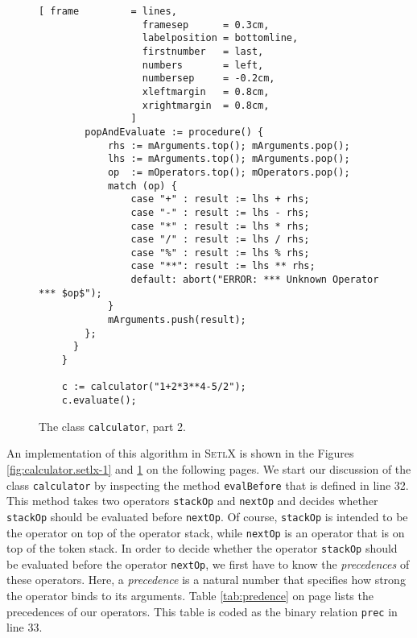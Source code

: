 \begin{figure}[!htb]
  \centering
\begin{Verbatim}[ frame         = lines, 
                  framesep      = 0.3cm, 
                  labelposition = bottomline,
                  firstnumber   = last,
                  numbers       = left,
                  numbersep     = -0.2cm,
                  xleftmargin   = 0.8cm,
                  xrightmargin  = 0.8cm,
                ]
        popAndEvaluate := procedure() {
            rhs := mArguments.top(); mArguments.pop();
            lhs := mArguments.top(); mArguments.pop();
            op  := mOperators.top(); mOperators.pop();
            match (op) {
                case "+" : result := lhs + rhs;
                case "-" : result := lhs - rhs;
                case "*" : result := lhs * rhs;
                case "/" : result := lhs / rhs;
                case "%" : result := lhs % rhs;
                case "**": result := lhs ** rhs;       
                default: abort("ERROR: *** Unknown Operator *** $op$");
            }
            mArguments.push(result);
        };    
      }
    }
    
    c := calculator("1+2*3**4-5/2");
    c.evaluate();
\end{Verbatim}
\vspace*{-0.3cm}
  \caption{The class \texttt{calculator}, part 2.}
  \label{fig:calculator.setlx-2}
\end{figure} 

\noindent
An implementation of this algorithm in \textsc{SetlX} is shown in the Figures
\ref{fig:calculator.setlx-1} and \ref{fig:calculator.setlx-2} on the following pages.
We start our discussion of the class \texttt{calculator} by inspecting the method
\texttt{evalBefore} that is defined in line 32.
This method takes two operators \texttt{stackOp} and \texttt{nextOp} and decides
whether \texttt{stackOp} should be evaluated before \texttt{nextOp}.  Of course, \texttt{stackOp} is
intended to be the operator on top of the operator stack, while \texttt{nextOp} is an operator that
is on top of the token stack.
In order to decide whether the operator \texttt{stackOp} should be evaluated before the operator
\texttt{nextOp},  we first have to know the \emph{precedences} of these operators.  Here, a
\emph{precedence} is a natural number that specifies how strong the operator binds to its
arguments. Table \ref{tab:predence} on page \pageref{tab:predence} lists the precedences of our
operators.  This table is coded as the binary relation \texttt{prec} in line 33.

